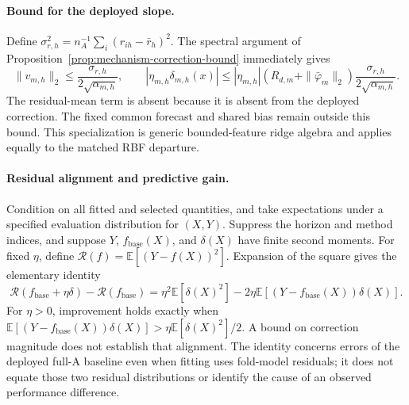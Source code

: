 \paragraph{Bound for the deployed slope.}
Define $\sigma_{r,h}^2=n_A^{-1}\sum_i(r_{ih}-\bar r_h)^2$.
The spectral argument of
Proposition~\ref{prop:mechanism-correction-bound} immediately gives
\begin{equation}
 \|v_{m,h}\|_2\leq\frac{\sigma_{r,h}}{2\sqrt{\alpha_{m,h}}},\qquad
 |\eta_{m,h}\delta_{m,h}(x)|\leq
 |\eta_{m,h}|(R_{d,m}+\|\bar\varphi_m\|_2)
 \frac{\sigma_{r,h}}{2\sqrt{\alpha_{m,h}}}.
 \label{eq:mechanism-centered-slope-bound}
\end{equation}
The residual-mean term is absent because it is absent from the deployed
correction. The fixed common forecast and shared bias remain outside
this bound. This specialization is generic bounded-feature ridge
algebra and applies equally to the matched RBF departure.

\paragraph{Residual alignment and predictive gain.}
Condition on all fitted and selected quantities, and take expectations
under a specified evaluation distribution for $(X,Y)$. Suppress the
horizon and method indices, and suppose $Y$, $f_{\mathrm{base}}(X)$,
and $\delta(X)$ have finite second moments. For fixed $\eta$, define
$\mathcal R(f)=\mathbb E[(Y-f(X))^2]$. Expansion of the square gives
the elementary identity
\begin{equation}
 \mathcal R(f_{\mathrm{base}}+\eta\delta)
 -\mathcal R(f_{\mathrm{base}})
 =\eta^2\mathbb E[\delta(X)^2]
 -2\eta\mathbb E[(Y-f_{\mathrm{base}}(X))\delta(X)].
 \label{eq:mechanism-residual-risk}
\end{equation}
For $\eta>0$, improvement holds exactly when
$\mathbb E[(Y-f_{\mathrm{base}}(X))\delta(X)]>
\eta\mathbb E[\delta(X)^2]/2$. A bound on correction
magnitude does not establish that alignment. The identity concerns
errors of the deployed full-A baseline even when fitting uses fold-model
residuals; it does not equate those two residual distributions or
identify the cause of an observed performance difference.
